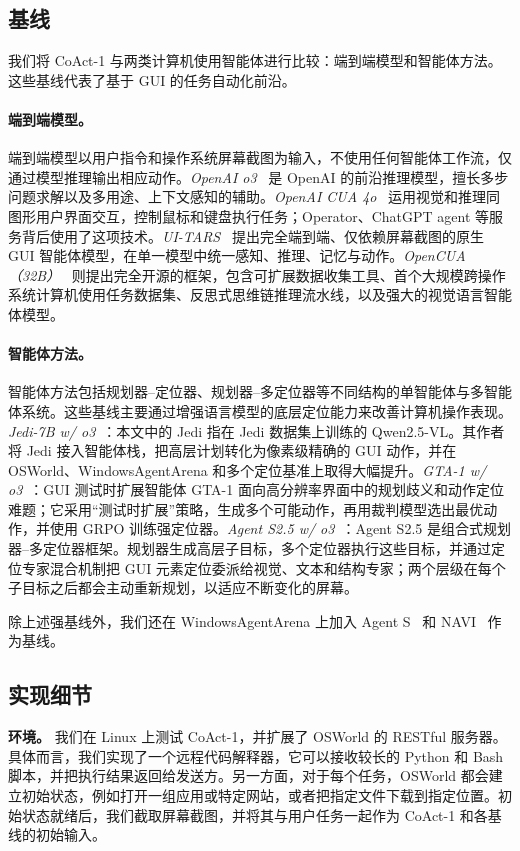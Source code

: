 \documentclass{article} %
\newcommand{\ours}{CoAct-1\xspace}
\begin{document}
\subsection{基线}
我们将 \ours 与两类计算机使用智能体进行比较：端到端模型和智能体方法。这些基线代表了基于 GUI 的任务自动化前沿。
\paragraph{端到端模型。}
端到端模型以用户指令和操作系统屏幕截图为输入，不使用任何智能体工作流，仅通过模型推理输出相应动作。\textit{OpenAI o3}~\citep{openAI_o3_o4_mini} 是 OpenAI 的前沿推理模型，擅长多步问题求解以及多用途、上下文感知的辅助。\textit{OpenAI CUA 4o}~\citep{cua2025} 运用视觉和推理同图形用户界面交互，控制鼠标和键盘执行任务；Operator、ChatGPT agent 等服务背后使用了这项技术。\textit{UI-TARS}~\citep{qin2025ui} 提出完全端到端、仅依赖屏幕截图的原生 GUI 智能体模型，在单一模型中统一感知、推理、记忆与动作。\textit{OpenCUA（32B）}~\citep{wang2025opencua} 则提出完全开源的框架，包含可扩展数据收集工具、首个大规模跨操作系统计算机使用任务数据集、反思式思维链推理流水线，以及强大的视觉语言智能体模型。

\paragraph{智能体方法。}
智能体方法包括规划器--定位器、规划器--多定位器等不同结构的单智能体与多智能体系统。这些基线主要通过增强语言模型的底层定位能力来改善计算机操作表现。\textit{Jedi-7B w/ o3}~\citep{xie2025scaling}：本文中的 Jedi 指在 Jedi 数据集上训练的 Qwen2.5-VL。其作者将 Jedi 接入智能体栈，把高层计划转化为像素级精确的 GUI 动作，并在 OSWorld、WindowsAgentArena 和多个定位基准上取得大幅提升。\textit{GTA-1 w/ o3}~\citep{yang2025gta1guitesttimescaling}：GUI 测试时扩展智能体 GTA-1 面向高分辨率界面中的规划歧义和动作定位难题；它采用“测试时扩展”策略，生成多个可能动作，再用裁判模型选出最优动作，并使用 GRPO 训练强定位器。\textit{Agent S2.5 w/ o3}~\citep{agashe2025agent}：Agent S2.5 是组合式规划器--多定位器框架。规划器生成高层子目标，多个定位器执行这些目标，并通过定位专家混合机制把 GUI 元素定位委派给视觉、文本和结构专家；两个层级在每个子目标之后都会主动重新规划，以适应不断变化的屏幕。

除上述强基线外，我们还在 WindowsAgentArena 上加入 Agent S~\citep{agashe2024agent} 和 NAVI~\citep{bonatti2024windowsagentarenaevaluating} 作为基线。

\subsection{实现细节}
\noindent\textbf{环境。} 我们在 Linux 上测试 \ours，并扩展了 OSWorld 的 RESTful 服务器。具体而言，我们实现了一个远程代码解释器，它可以接收较长的 Python 和 Bash 脚本，并把执行结果返回给发送方。另一方面，对于每个任务，OSWorld 都会建立初始状态，例如打开一组应用或特定网站，或者把指定文件下载到指定位置。初始状态就绪后，我们截取屏幕截图，并将其与用户任务一起作为 \ours 和各基线的初始输入。
\end{document}
